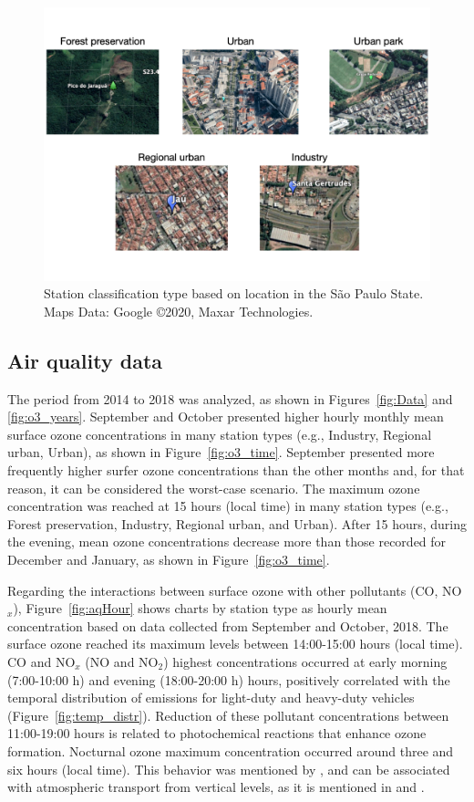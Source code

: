   	\begin{figure}[htb]
		\includegraphics[width=1\textwidth]{fig/Stations_type_reduced.pdf}
  		\caption{Station classification type based on location in the S\~{a}o Paulo State. Maps Data: Google \copyright 2020, Maxar Technologies.}
  		\label{fig:station_types}
	\end{figure}
	
  \subsection{Air quality data}
  The period from 2014 to 2018 was analyzed, as shown in Figures~\ref{fig:Data} and \ref{fig:o3_years}.
  September and October presented higher hourly monthly mean surface ozone concentrations in many station types (e.g., Industry, Regional urban, Urban), as shown in Figure~\ref{fig:o3_time}.
  September presented more frequently higher surfer ozone concentrations than the other months and, for that reason, it can be considered the worst-case scenario.
  The maximum ozone concentration was reached at 15 hours (local time) in many station types (e.g., Forest preservation, Industry, Regional urban, and Urban).
  After 15 hours, during the evening, mean ozone concentrations decrease more than those recorded for December and January, as shown in Figure~\ref{fig:o3_time}.
  
  Regarding the interactions between surface ozone with other pollutants (CO, NO$_x$), Figure~\ref{fig:aqHour} shows charts by station type as hourly mean concentration based on data collected from September and October, 2018.
	The surface ozone reached its maximum levels between 14:00-15:00 hours (local time).
	CO and NO$_x$ (NO and NO$_2$) highest concentrations occurred at early morning (7:00-10:00 h) and evening (18:00-20:00 h) hours, positively correlated with the temporal distribution of emissions for light-duty and heavy-duty vehicles (Figure~\ref{fig:temp_distr}).
	Reduction of these pollutant concentrations between 11:00-19:00 hours is related to photochemical reactions that enhance ozone formation.
	Nocturnal ozone maximum concentration occurred around three and six hours (local time).
	This behavior was mentioned by \citet{Carvalho2015}, and can be associated with atmospheric transport from vertical levels, as it is mentioned in \citet{Mazzoli2013} and \citet{Andrade2017}.
	
